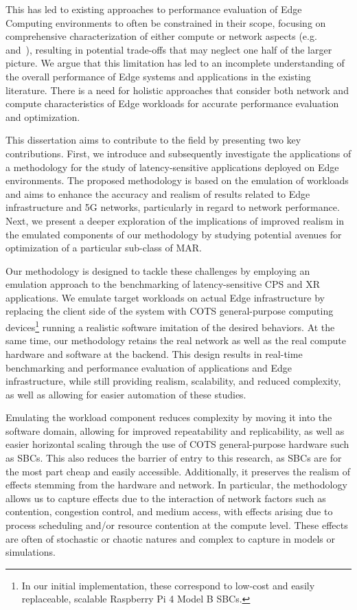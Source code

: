 This has led to existing approaches to performance evaluation of Edge Computing environments to often be constrained in their scope, focusing on comprehensive characterization of either compute or network aspects (e.g.~\cite{chen2015efficient} and~\cite{al2017reliable}), resulting in potential trade-offs that may neglect one half of the larger picture.
We argue that this limitation has led to an incomplete understanding of the overall performance of Edge systems and applications in the existing literature.
There is a need for holistic approaches that consider both network and compute characteristics of Edge workloads for accurate performance evaluation and optimization.

This dissertation aims to contribute to the field by presenting two key contributions.
First, we introduce and subsequently investigate the applications of a methodology for the study of latency-sensitive applications deployed on Edge environments.
The proposed methodology is based on the emulation of workloads and aims to enhance the accuracy and realism of results related to Edge infrastructure and 5G networks, particularly in regard to network performance.
Next, we present a deeper exploration of the implications of improved realism in the emulated components of our methodology by studying potential avenues for optimization of a particular sub-class of \gls{MAR}.

Our methodology is designed to tackle these challenges by employing an emulation approach to the benchmarking of latency-sensitive \gls{CPS} and \gls{XR} applications. 
We emulate target workloads on actual Edge infrastructure by replacing the client side of the system with \gls{COTS} general-purpose computing devices\footnote{%
    In our initial implementation, these correspond to low-cost and easily replaceable, scalable Raspberry Pi 4 Model B \acsp{SBC}.
} running a realistic software imitation of the desired behaviors.
At the same time, our methodology retains the real network as well as the real compute hardware and software at the backend.
This design results in real-time benchmarking and performance evaluation of applications and Edge infrastructure, while still providing realism, scalability, and reduced complexity, as well as allowing for easier automation of these studies.

Emulating the workload component reduces complexity by moving it into the software domain, allowing for improved repeatability and replicability, as well as easier horizontal scaling through the use of \gls{COTS} general-purpose hardware such as \glspl{SBC}.
This also reduces the barrier of entry to this research, as \glspl{SBC} are for the most part cheap and easily accessible.
Additionally, it preserves the realism of effects stemming from the hardware and network.
In particular, the methodology allows us to capture effects due to the interaction of network factors such as contention, congestion control, and medium access, with effects arising due to process scheduling and/or resource contention at the compute level.
These effects are often of stochastic or chaotic natures and complex to capture in models or simulations.

